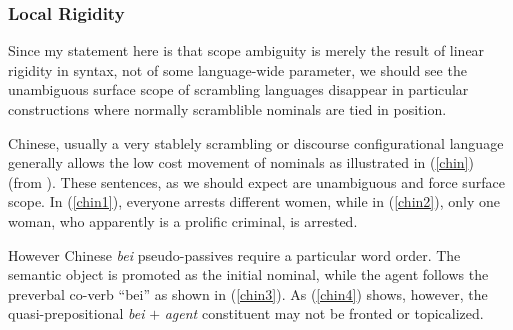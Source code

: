 \documentclass{article}
\begin{document}
\subsubsection{Local Rigidity}

Since my statement here is that scope ambiguity is merely the result of linear rigidity in syntax, not of some language-wide parameter, we should see the unambiguous surface scope of scrambling languages disappear in particular constructions where normally scramblible nominals are tied in position.

Chinese, usually a very stablely scrambling or discourse configurational language generally allows the low cost movement of nominals as illustrated in (\ref{chin}) (from \textcite{aoun93}). These sentences, as we should expect are unambiguous and force surface scope. In (\ref{chin1}), everyone arrests different women, while in (\ref{chin2}), only one woman, who apparently is a prolific criminal, is arrested.

\begin{exe}
\ex \begin{xlist}\label{chin}
\end{xlist}
\end{exe}

However Chinese \emph{bei} pseudo-passives require a particular word order. The semantic object is promoted as the initial nominal, while the agent follows the preverbal co-verb ``bei'' as shown in (\ref{chin3}). As (\ref{chin4}) shows, however, the quasi-prepositional \emph{bei} $+$ \emph{agent} constituent may not be fronted or topicalized.

\begin{exe}
\end{exe}
\end{document}
